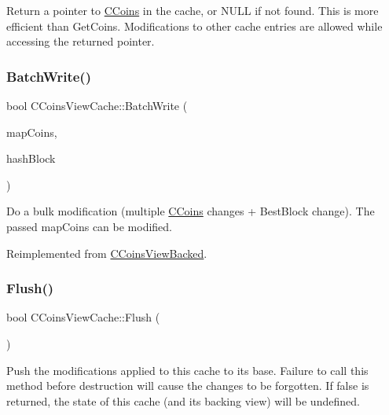 Return a pointer to \mbox{\hyperlink{class_c_coins}{C\+Coins}} in the cache, or N\+U\+LL if not found. This is more efficient than Get\+Coins. Modifications to other cache entries are allowed while accessing the returned pointer. \mbox{\label{class_c_coins_view_cache_a561bb7c6c97701b12c48fbbb563d0a91}} 
\subsubsection{\texorpdfstring{Batch\+Write()}{BatchWrite()}}
{\footnotesize\ttfamily bool C\+Coins\+View\+Cache\+::\+Batch\+Write (\begin{DoxyParamCaption}\item[{C\+Coins\+Map \&}]{map\+Coins,  }\item[{const \mbox{\hyperlink{classuint256}{uint256}} \&}]{hash\+Block }\end{DoxyParamCaption})\hspace{0.3cm}{\ttfamily [virtual]}}

Do a bulk modification (multiple \mbox{\hyperlink{class_c_coins}{C\+Coins}} changes + Best\+Block change). The passed map\+Coins can be modified. 

Reimplemented from \mbox{\hyperlink{class_c_coins_view_backed_ace15da3934c9d7a9cb9c7a787f92f764}{C\+Coins\+View\+Backed}}.

\mbox{\label{class_c_coins_view_cache_ac9888d4feaa46666d03871cd7cd1c01d}} 
\subsubsection{\texorpdfstring{Flush()}{Flush()}}
{\footnotesize\ttfamily bool C\+Coins\+View\+Cache\+::\+Flush (\begin{DoxyParamCaption}{ }\end{DoxyParamCaption})}

Push the modifications applied to this cache to its base. Failure to call this method before destruction will cause the changes to be forgotten. If false is returned, the state of this cache (and its backing view) will be undefined. \mbox{\label{class_c_coins_view_cache_a1a8cd6069fba96939ffcb1bd36ffb921}} 
